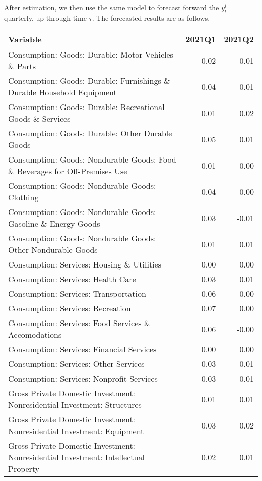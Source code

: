 \documentclass[11pt, letterpaper]{article}\usepackage[]{graphicx}\usepackage[]{color}
\begin{document}
After estimation, we then use the same model to forecast forward the $y^i_t$ quarterly, up through time $\tau$. 
The forecasted results are as follows.
\begin{table}[H]
\centering
\begingroup\scriptsize
\begin{tabular}{lrr}
  \hline
Variable & 2021Q1 & 2021Q2 \\ 
  \hline
Consumption: Goods: Durable: Motor Vehicles \& Parts & 0.02 & 0.01 \\ 
  Consumption: Goods: Durable: Furnishings \& Durable Household Equipment & 0.04 & 0.01 \\ 
  Consumption: Goods: Durable: Recreational Goods \& Services & 0.01 & 0.02 \\ 
  Consumption: Goods: Durable: Other Durable Goods & 0.05 & 0.01 \\ 
  Consumption: Goods: Nondurable Goods: Food \& Beverages for Off-Premises Use & 0.01 & 0.00 \\ 
  Consumption: Goods: Nondurable Goods: Clothing & 0.04 & 0.00 \\ 
  Consumption: Goods: Nondurable Goods: Gasoline \& Energy Goods & 0.03 & -0.01 \\ 
  Consumption: Goods: Nondurable Goods: Other Nondurable Goods & 0.01 & 0.01 \\ 
  Consumption: Services: Housing \& Utilities & 0.00 & 0.00 \\ 
  Consumption: Services: Health Care & 0.03 & 0.01 \\ 
  Consumption: Services: Transportation & 0.06 & 0.00 \\ 
  Consumption: Services: Recreation & 0.07 & 0.00 \\ 
  Consumption: Services: Food Services \& Accomodations & 0.06 & -0.00 \\ 
  Consumption: Services: Financial Services & 0.00 & 0.00 \\ 
  Consumption: Services: Other Services & 0.03 & 0.01 \\ 
  Consumption: Services: Nonprofit Services & -0.03 & 0.01 \\ 
  Gross Private Domestic Investment: Nonresidential Investment: Structures & 0.01 & 0.01 \\ 
  Gross Private Domestic Investment: Nonresidential Investment: Equipment & 0.03 & 0.02 \\ 
  Gross Private Domestic Investment: Nonresidential Investment: Intellectual Property & 0.02 & 0.01 \\ 

\end{tabular}
\end{table}
\end{document}
